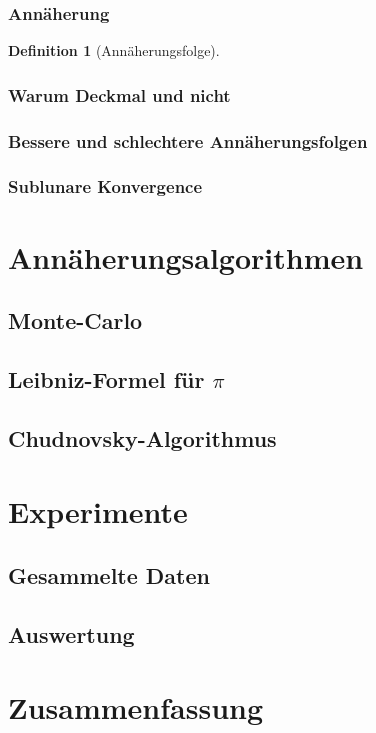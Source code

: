\documentclass{scrartcl}
\newtheorem{definition}{Definition}
\begin{document}
\subsubsection{Annäherung}

\begin{definition}[Annäherungsfolge]

\end{definition}

\subsubsection{Warum Deckmal und nicht }

\subsubsection{Bessere und schlechtere Annäherungsfolgen}

\subsubsection{Sublunare Konvergence}

\section{Annäherungsalgorithmen}

\subsection{Monte-Carlo}

\subsection{Leibniz-Formel für \(\pi\)}

\subsection{Chudnovsky-Algorithmus}

\section{Experimente}

\subsection{Gesammelte Daten}

\subsection{Auswertung}

\section{Zusammenfassung}

\printbibliography
\end{document}
